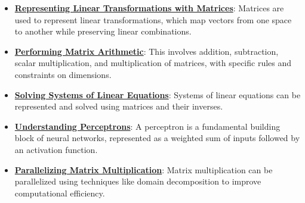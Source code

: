 \documentclass{article}%
\begin{document}
\begin{itemize}[leftmargin=*]%
\item \href{https://purdue.brightspace.com/d2l/common/assets/pdfjs-d2l-dist/1.0.14-legacy/web/viewer.html?file=\%2Fcontent\%2Fenforced\%2F1095467-wl.202510.CS.24300.001\%2F04L1-Linear Algebra Primer.pdf\%3Fou\%3D1095467\&lang=en-us\&container=d2l-fileviewer-rendered-pdf\&fullscreen=d2l-fileviewer-rendered-pdf-dialog\&height=667#page=5}{\textbf{Representing Linear Transformations with Matrices}}: Matrices are used to represent linear transformations, which map vectors from one space to another while preserving linear combinations.%
\item \href{https://purdue.brightspace.com/d2l/common/assets/pdfjs-d2l-dist/1.0.14-legacy/web/viewer.html?file=\%2Fcontent\%2Fenforced\%2F1095467-wl.202510.CS.24300.001\%2F04L1-Linear Algebra Primer.pdf\%3Fou\%3D1095467\&lang=en-us\&container=d2l-fileviewer-rendered-pdf\&fullscreen=d2l-fileviewer-rendered-pdf-dialog\&height=667#page=9}{\textbf{Performing Matrix Arithmetic}}: This involves addition, subtraction, scalar multiplication, and multiplication of matrices, with specific rules and constraints on dimensions.%
\item \href{https://purdue.brightspace.com/d2l/common/assets/pdfjs-d2l-dist/1.0.14-legacy/web/viewer.html?file=\%2Fcontent\%2Fenforced\%2F1095467-wl.202510.CS.24300.001\%2F04L1-Linear Algebra Primer.pdf\%3Fou\%3D1095467\&lang=en-us\&container=d2l-fileviewer-rendered-pdf\&fullscreen=d2l-fileviewer-rendered-pdf-dialog\&height=667#page=11}{\textbf{Solving Systems of Linear Equations}}: Systems of linear equations can be represented and solved using matrices and their inverses.%
\item \href{https://purdue.brightspace.com/d2l/common/assets/pdfjs-d2l-dist/1.0.14-legacy/web/viewer.html?file=\%2Fcontent\%2Fenforced\%2F1095467-wl.202510.CS.24300.001\%2F04L1-Linear Algebra Primer.pdf\%3Fou\%3D1095467\&lang=en-us\&container=d2l-fileviewer-rendered-pdf\&fullscreen=d2l-fileviewer-rendered-pdf-dialog\&height=667#page=17}{\textbf{Understanding Perceptrons}}: A perceptron is a fundamental building block of neural networks, represented as a weighted sum of inputs followed by an activation function.%
\item \href{https://purdue.brightspace.com/d2l/common/assets/pdfjs-d2l-dist/1.0.14-legacy/web/viewer.html?file=\%2Fcontent\%2Fenforced\%2F1095467-wl.202510.CS.24300.001\%2F04L1-Linear Algebra Primer.pdf\%3Fou\%3D1095467\&lang=en-us\&container=d2l-fileviewer-rendered-pdf\&fullscreen=d2l-fileviewer-rendered-pdf-dialog\&height=667#page=18}{\textbf{Parallelizing Matrix Multiplication}}: Matrix multiplication can be parallelized using techniques like domain decomposition to improve computational efficiency.%

\end{itemize}
\end{document}
